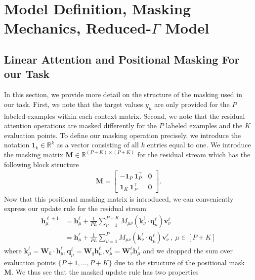 \documentclass{article} %
\def\h{\bm h}
\begin{document}
\section{Model Definition, Masking Mechanics, Reduced-$\Gamma$ Model}\label{app:reduced_Gamma_derivation}

\subsection{Linear Attention and Positional Masking For our Task}

In this section, we provide more detail on the structure of the masking used in our task. First, we note that the target values $y_\mu$ are only provided for the $P$ labeled examples within each context matrix. Second, we note that the residual attention operations are masked differently for the $P$ labeled examples and the $K$ evaluation points. To define our masking operation precisely, we introduce the notation $\bm 1_k \in \mathbb{R}^k$ as a vector consisting of all $k$ entries equal to one. We introduce the masking matrix $\bm M \in \mathbb{R}^{(P+K)\times (P+K)}$ for the residual stream which has the following block structure
\begin{align}
    \bm M = 
    \begin{bmatrix}
        - \bm 1_P \ \bm 1_P^\top & \bm 0
        \\
        \bm 1_K \  \bm 1_P^\top & \bm 0 
    \end{bmatrix} . 
\end{align}
Now that this positional masking matrix is introduced, we can conveniently express our update rule for the residual stream
\begin{align}
    \h^{\ell+1}_\mu &= \h^\ell_\mu +  \frac{1}{P L} \sum_{\nu=1}^{P+K} M_{\mu\nu}  \left( \bm k^\ell_\nu \cdot \bm q^\ell_\mu \right)  \bm v_{\nu}^\ell \nonumber
    \\
    &=  \h^\ell_\mu +  \frac{1}{P L} \sum_{\nu=1}^{P} M_{\mu\nu}  \left( \bm k^\ell_\nu \cdot \bm q^\ell_\mu \right)  \bm v_{\nu}^\ell \ , \ \mu \in [P+K]
\end{align}
where $\bm k^\ell_\mu = \bm W_k \cdot \h^\ell_\mu, \bm q^\ell_\mu = \bm W_q \h^\ell_\mu, \bm v^\ell_\mu = \bm W^\ell_v \h^\ell_\mu$ and we dropped the sum over evaluation points $\{ P+1,...,P+K \}$ due to the structure of the positional mask $\bm M$. We thus see that the masked update rule has two properties
\end{document}
